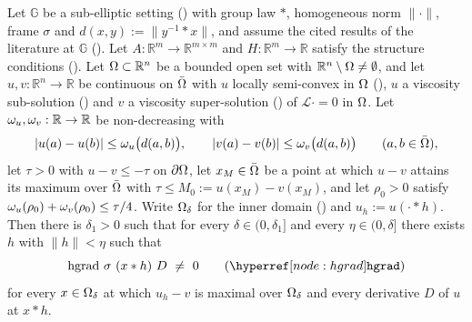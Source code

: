 \begin{lemma}
Let $\mathbb G$ be a sub-elliptic setting () with group law $*$,
homogeneous norm $\|\cdot\|$, frame $\sigma$ and $d(x,y):=\|y^{-1}*x\|$, and assume the
cited results of the literature at $\mathbb G$ (). Let
$A:\mathbb R^{m}\to\mathbb R^{m\times m}$ and $H:\mathbb R^{m}\to\mathbb R$ satisfy the
structure conditions (). Let $\Omega\subset\mathbb R^{n}$ be a
bounded open set with $\mathbb R^{n}\setminus\Omega\ne\emptyset$, and let
$u,v:\mathbb R^{n}\to\mathbb R$ be continuous on $\bar{\Omega}$ with $u$ locally semi-convex in
$\Omega$ (), $u$ a viscosity sub-solution
() and $v$ a viscosity super-solution () of
$\mathcal L\cdot=0$ in $\Omega$. Let $\omega_u,\omega_v:\mathbb R\to\mathbb R$ be non-decreasing with
\[
 |u(a)-u(b)|\le\omega_u\big(d(a,b)\big),\qquad |v(a)-v(b)|\le\omega_v\big(d(a,b)\big)
 \qquad(a,b\in\bar{\Omega}),
\]
let $\tau>0$ with $u-v\le-\tau$ on $\partial\Omega$, let $x_M\in\bar{\Omega}$ be a point at which $u-v$
attains its maximum over $\bar{\Omega}$ with $\tau\le M_0:=u(x_M)-v(x_M)$, and let $\rho_0>0$
satisfy $\omega_u(\rho_0)+\omega_v(\rho_0)\le\tau/4$. Write $\Omega_\delta$ for the inner domain
() and $u_h:=u(\cdot*h)$. Then there is $\delta_1>0$ such that for
every $\delta\in(0,\delta_1]$ and every $\eta\in(0,\delta]$ there exists $h$ with
$\|h\|<\eta$ such that
\[
 \mathrm{hgrad}\ \sigma\ (x*h)\ D\ \ne\ 0\qquad(\noderef{hgrad})
\]
for every $x\in\Omega_\delta$ at which $u_h-v$ is maximal over $\Omega_\delta$ and every
derivative $D$ of $u$ at $x*h$.
\end{lemma}
